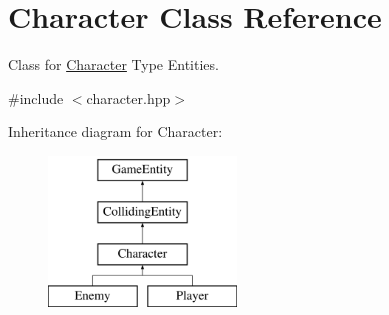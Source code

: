 \hypertarget{class_character}{}\section{Character Class Reference}
\label{class_character}


Class for \mbox{\hyperlink{class_character}{Character}} Type Entities.  




{\ttfamily \#include $<$character.\+hpp$>$}

Inheritance diagram for Character\+:\begin{figure}[H]
\begin{center}
\leavevmode
\includegraphics[height=4.000000cm]{class_character}
\end{center}
\end{figure}
